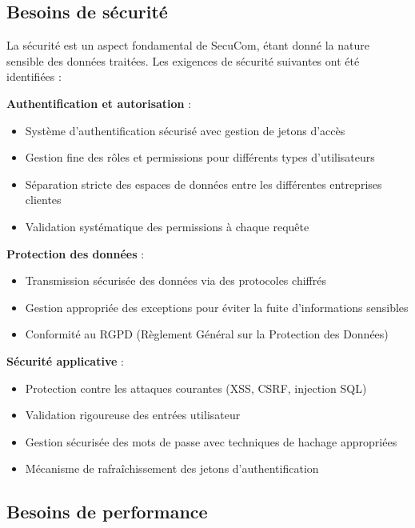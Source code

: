 \subsection{Besoins de sécurité}

La sécurité est un aspect fondamental de SecuCom, étant donné la nature sensible des données traitées. Les exigences de sécurité suivantes ont été identifiées :


\vspace{0.5cm}
\textbf{Authentification et autorisation} :
\begin{itemize}[leftmargin=*,label=\textcolor{darkgray}{$\bullet$},itemsep=0.3em]
  \item Système d'authentification sécurisé avec gestion de jetons d'accès
  \item Gestion fine des rôles et permissions pour différents types d'utilisateurs
  \item Séparation stricte des espaces de données entre les différentes entreprises clientes
  \item Validation systématique des permissions à chaque requête
\end{itemize}


\newpage
\textbf{Protection des données} :
\begin{itemize}[leftmargin=*,label=\textcolor{darkgray}{$\bullet$},itemsep=0.3em]
  \item Transmission sécurisée des données via des protocoles chiffrés
  \item Gestion appropriée des exceptions pour éviter la fuite d'informations sensibles
  \item Conformité au RGPD (Règlement Général sur la Protection des Données)
\end{itemize}


\vspace{0.5cm}
\textbf{Sécurité applicative} :
\begin{itemize}[leftmargin=*,label=\textcolor{darkgray}{$\bullet$},itemsep=0.3em]
  \item Protection contre les attaques courantes (XSS, CSRF, injection SQL)
  \item Validation rigoureuse des entrées utilisateur
  \item Gestion sécurisée des mots de passe avec techniques de hachage appropriées
  \item Mécanisme de rafraîchissement des jetons d'authentification
\end{itemize}

\subsection{Besoins de performance}

